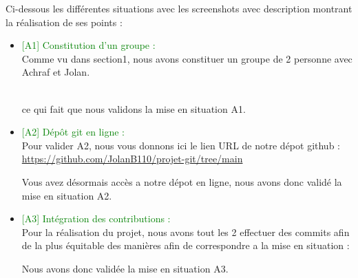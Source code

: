 Ci-dessous les différentes situations avec les screenshots avec description montrant la réalisation de ses points :

\begin{itemize}
    \item \textcolor{green}{[A1] Constitution d’un groupe :}
    \\Comme vu dans section1, nous avons constituer un groupe de 2 personne avec Achraf et Jolan.
    \begin{figure}[h]
    \centering
    \end{figure}
    \\ce qui fait que nous validons la mise en situation A1.

    \item \textcolor{green}{[A2] Dépôt git en ligne : }
    \\Pour valider A2, nous vous donnons ici le lien URL de notre dépot github : 
    \url{https://github.com/JolanB110/projet-git/tree/main}

    Vous avez désormais accès a notre dépot en ligne, nous avons donc validé la mise en situation A2.
    
    \item \textcolor{green}{[A3] Intégration des contributions : }
    \\ Pour la réalisation du projet, nous avons tout les 2 effectuer des commits afin de la plus équitable des manières afin de correspondre a la mise en situation :\\

    \begin{figure}[h]
    \centering
    \end{figure}
    \begin{figure}[h]
    \centering
    \end{figure}
    Nous avons donc validée la mise en situation A3.


\end{itemize}
